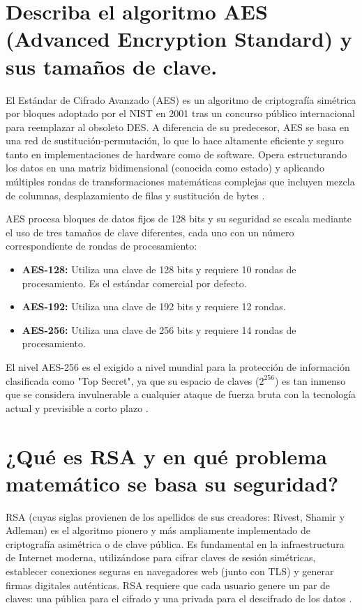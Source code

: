 \documentclass[a4paper,12pt]{article}
\begin{document}
\section{Describa el algoritmo AES (Advanced Encryption Standard) y sus tamaños de clave.}

El Estándar de Cifrado Avanzado (AES) es un algoritmo de criptografía simétrica por bloques adoptado por el NIST en 2001 tras un concurso público internacional para reemplazar al obsoleto DES. A diferencia de su predecesor, AES se basa en una red de sustitución-permutación, lo que lo hace altamente eficiente y seguro tanto en implementaciones de hardware como de software. Opera estructurando los datos en una matriz bidimensional (conocida como estado) y aplicando múltiples rondas de transformaciones matemáticas complejas que incluyen mezcla de columnas, desplazamiento de filas y sustitución de bytes \cite{nist2001}.

AES procesa bloques de datos fijos de 128 bits y su seguridad se escala mediante el uso de tres tamaños de clave diferentes, cada uno con un número correspondiente de rondas de procesamiento:
\begin{itemize}
    \item \textbf{AES-128:} Utiliza una clave de 128 bits y requiere 10 rondas de procesamiento. Es el estándar comercial por defecto.
    \item \textbf{AES-192:} Utiliza una clave de 192 bits y requiere 12 rondas.
    \item \textbf{AES-256:} Utiliza una clave de 256 bits y requiere 14 rondas de procesamiento.
\end{itemize}
El nivel AES-256 es el exigido a nivel mundial para la protección de información clasificada como "Top Secret", ya que su espacio de claves ($2^{256}$) es tan inmenso que se considera invulnerable a cualquier ataque de fuerza bruta con la tecnología actual y previsible a corto plazo \cite{stallings2017}.

\section{¿Qué es RSA y en qué problema matemático se basa su seguridad?}

RSA (cuyas siglas provienen de los apellidos de sus creadores: Rivest, Shamir y Adleman) es el algoritmo pionero y más ampliamente implementado de criptografía asimétrica o de clave pública. Es fundamental en la infraestructura de Internet moderna, utilizándose para cifrar claves de sesión simétricas, establecer conexiones seguras en navegadores web (junto con TLS) y generar firmas digitales auténticas. RSA requiere que cada usuario genere un par de claves: una pública para el cifrado y una privada para el descifrado de los datos \cite{kurose2017}.
\end{document}
